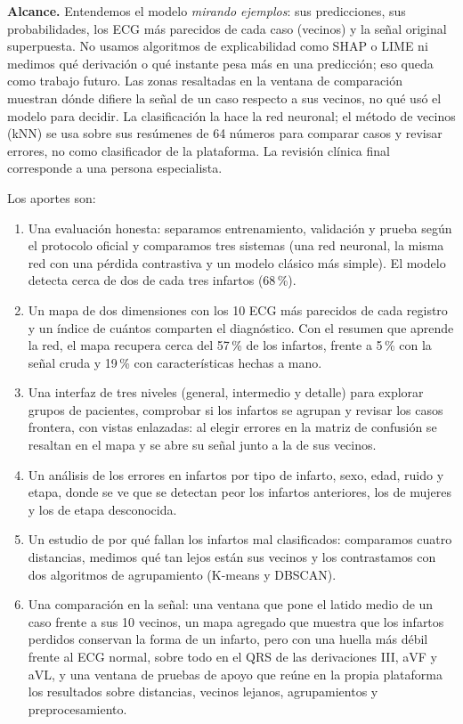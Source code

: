 \documentclass[conference]{IEEEtran}
\begin{document}
\textbf{Alcance.} Entendemos el modelo \emph{mirando ejemplos}: sus predicciones, sus probabilidades, los ECG más parecidos de cada caso (vecinos) y la señal original superpuesta. No usamos algoritmos de explicabilidad como SHAP o LIME ni medimos qué derivación o qué instante pesa más en una predicción; eso queda como trabajo futuro. Las zonas resaltadas en la ventana de comparación muestran dónde difiere la señal de un caso respecto a sus vecinos, no qué usó el modelo para decidir. La clasificación la hace la red neuronal; el método de vecinos (kNN) se usa sobre sus resúmenes de 64 números para comparar casos y revisar errores, no como clasificador de la plataforma. La revisión clínica final corresponde a una persona especialista.

Los aportes son:
\begin{enumerate}
\item Una evaluación honesta: separamos entrenamiento, validación y prueba según el protocolo oficial y comparamos tres sistemas (una red neuronal, la misma red con una pérdida contrastiva y un modelo clásico más simple). El modelo detecta cerca de dos de cada tres infartos (68\,\%).
\item Un mapa de dos dimensiones con los 10 ECG más parecidos de cada registro y un índice de cuántos comparten el diagnóstico. Con el resumen que aprende la red, el mapa recupera cerca del 57\,\% de los infartos, frente a 5\,\% con la señal cruda y 19\,\% con características hechas a mano.
\item Una interfaz de tres niveles (general, intermedio y detalle) para explorar grupos de pacientes, comprobar si los infartos se agrupan y revisar los casos frontera, con vistas enlazadas: al elegir errores en la matriz de confusión se resaltan en el mapa y se abre su señal junto a la de sus vecinos.
\item Un análisis de los errores en infartos por tipo de infarto, sexo, edad, ruido y etapa, donde se ve que se detectan peor los infartos anteriores, los de mujeres y los de etapa desconocida.
\item Un estudio de por qué fallan los infartos mal clasificados: comparamos cuatro distancias, medimos qué tan lejos están sus vecinos y los contrastamos con dos algoritmos de agrupamiento (K-means y DBSCAN).
\item Una comparación en la señal: una ventana que pone el latido medio de un caso frente a sus 10 vecinos, un mapa agregado que muestra que los infartos perdidos conservan la forma de un infarto, pero con una huella más débil frente al ECG normal, sobre todo en el QRS de las derivaciones III, aVF y aVL, y una ventana de pruebas de apoyo que reúne en la propia plataforma los resultados sobre distancias, vecinos lejanos, agrupamientos y preprocesamiento.
\end{enumerate}
\end{document}
